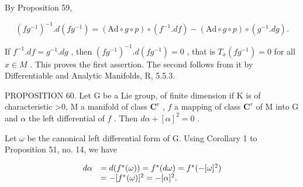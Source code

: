 By Proposition 59,

\[
(f g ^ {- 1}) ^ {- 1}. d (f g ^ {- 1}) = (\mathrm{Ad} \circ g \circ p) \circ (f ^ {- 1}. d f) - (\mathrm{Ad} \circ g \circ p) \circ (g ^ {- 1}. d g).
\]

If \(f^{-1}.df = g^{-1}.dg\) , then \((fg^{-1})^{-1}.d(fg^{-1}) = 0\) , that is \(T_x(fg^{-1}) = 0\) for all \(x \in M\) . This proves the first assertion. The second follows from it by Differentiable and Analytic Manifolds, R, 5.5.3.

PROPOSITION 60. Let G be a Lie group, of finite dimension if K is of characteristic \textgreater0, M a manifold of class \(\mathbf{C}^r\) , \(f\) a mapping of class \(\mathbf{C}^r\) of M into G and \(\alpha\) the left differential of \(f\) . Then \(d\alpha + [\alpha]^2 = 0\) .

Let \(\omega\) be the canonical left differential form of G. Using Corollary 1 to Proposition 51, no. 14, we have

\[
\begin{array}{r l} d \alpha & = d (f ^ {*} (\omega)) = f ^ {*} (d \omega) = f ^ {*} (- [ \omega ] ^ {2}) \\ & = - [ f ^ {*} (\omega) ] ^ {2} = - [ \alpha ] ^ {2}. \end{array}
\]


